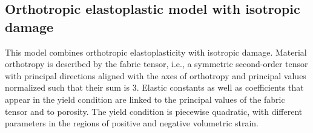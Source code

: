 \documentclass[a4paper]{article}
\begin{document}
\subsection{Orthotropic elastoplastic model with isotropic damage}

This model combines orthotropic elastoplasticity with isotropic damage.
Material orthotropy is described by the fabric tensor, i.e., a symmetric second-order
tensor with principal directions aligned with the axes of orthotropy and principal
values normalized such that their sum is 3. Elastic constants as well as coefficients
that appear in the yield condition are linked to the principal values of the
fabric tensor and to porosity. The yield condition is piecewise quadratic,
with different parameters in the regions of positive and negative volumetric strain. 
\end{document}
